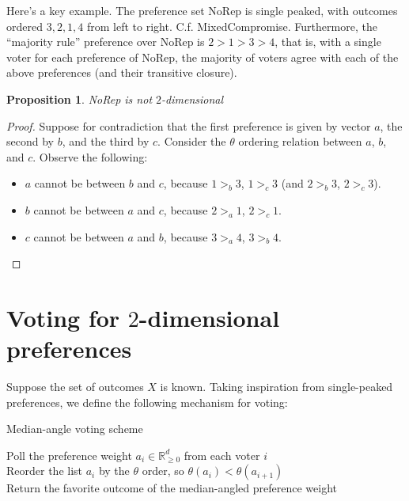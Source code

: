 \documentclass[12pt]{article}
\newtheorem{proposition}[theorem]{Proposition}
\newcommand{\Rgz}{\mathbb{R}_{\ge 0}}
\newcommand{\1}[1]{\mathds{1}[{#1}]}
\begin{document}
  Here's a key example. The preference set {\sc NoRep} is single peaked, with
  outcomes ordered $3,2,1,4$ from left to right.
  C.f. {\sc MixedCompromise}. Furthermore, the ``majority
  rule'' preference over {\sc NoRep} is $2>1>3>4$, that is, with a single
  voter for each preference of {\sc NoRep}, the majority of voters agree with
  each of the above preferences (and their transitive closure).
  \begin{proposition}
    {\sc NoRep} is not $2$-dimensional
  \end{proposition}
  \begin{proof}
    Suppose for contradiction that the first preference is given by vector $a$,
    the second by $b$, and the third by $c$.
    Consider the $\theta$ ordering relation between $a$, $b$, and $c$.
    Observe the following:
    \begin{itemize}
      \item $a$ cannot be between $b$ and $c$, because $1 >_b 3$, $1 >_c 3$ 
        (and $2 >_b 3$, $2 >_c 3$).
      \item $b$ cannot be between $a$ and $c$, because $2 >_a 1$, $2 >_c 1$.
      \item $c$ cannot be between $a$ and $b$, because $3 >_a 4$, $3 >_b 4$.
    \end{itemize}
  \end{proof}



\section{Voting for $2$-dimensional preferences}
  \label{sec:voting}

  Suppose the set of outcomes $X$ is known.
  Taking inspiration from single-peaked preferences, we define the following
  mechanism for voting:

  \begin{algorithm}
    \caption{Median-angle voting scheme}
    Poll the preference weight $a_i\in\Rgz^d$ from each voter $i$ \\
    Reorder the list $a_i$ by the $\theta$ order, so 
      $\theta(a_i) < \theta(a_{i+1})$ \\
    Return the favorite outcome of the median-angled preference weight
  \end{algorithm}
\end{document}
